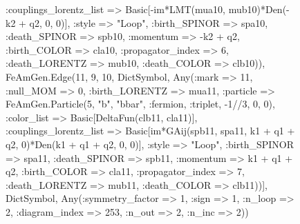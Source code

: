 \documentclass{revtex4}
\begin{document}
\begin{figure}[!htb]
\begin{center}
{:couplings_lorentz_list => Basic[-im*LMT(mua10, mub10)*Den(-k2 + q2, 0, 0)], :style => "Loop", :birth_SPINOR => spa10, :death_SPINOR => spb10, :momentum => -k2 + q2, :birth_COLOR => cla10, :propagator_index => 6, :death_LORENTZ => mub10, :death_COLOR => clb10)), FeAmGen.Edge(11, 9, 10, Dict{Symbol, Any}(:mark => 11, :null_MOM => 0, :birth_LORENTZ => mua11, :particle => FeAmGen.Particle(5, "b", "bbar", :fermion, :triplet, -1//3, 0, 0), :color_list => Basic[DeltaFun(clb11, cla11)], :couplings_lorentz_list => Basic[im*GAij(spb11, spa11, k1 + q1 + q2, 0)*Den(k1 + q1 + q2, 0, 0)], :style => "Loop", :birth_SPINOR => spa11, :death_SPINOR => spb11, :momentum => k1 + q1 + q2, :birth_COLOR => cla11, :propagator_index => 7, :death_LORENTZ => mub11, :death_COLOR => clb11))], Dict{Symbol, Any}(:symmetry_factor => 1, :sign => 1, :n_loop => 2, :diagram_index => 253, :n_out => 2, :n_inc => 2)) 
}
\end{center}
\end{figure}
\end{document}
